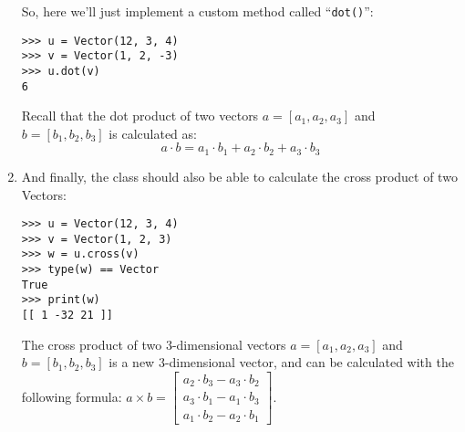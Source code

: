 \begin{enumerate}
So, here we'll just implement a custom method called ``\texttt{dot()}'':
\begin{verbatim}
>>> u = Vector(12, 3, 4)
>>> v = Vector(1, 2, -3)
>>> u.dot(v)
6
\end{verbatim}

Recall that the dot product of two vectors
$a = [a_1, a_2, a_3]$ and $b = [b_1, b_2, b_3]$
is calculated as:
\[a \cdot b = a_1 \cdot b_1 + a_2 \cdot b_2 + a_3 \cdot b_3\]

\item
And finally, the class should also be able to calculate
the cross product of two Vectors:
\begin{verbatim}
>>> u = Vector(12, 3, 4)
>>> v = Vector(1, 2, 3)
>>> w = u.cross(v)
>>> type(w) == Vector
True
>>> print(w)
[[ 1 -32 21 ]]
\end{verbatim}

The cross product of two $3$-dimensional vectors
$a = [a_1, a_2, a_3]$ and $b = [b_1, b_2, b_3]$
is a new $3$-dimensional vector,
and can be calculated with the following formula:
$a \times b = \begin{bmatrix}
    a_2 \cdot b_3 - a_3 \cdot b_2 \\
    a_3 \cdot b_1 - a_1 \cdot b_3 \\
    a_1 \cdot b_2 - a_2 \cdot b_1
\end{bmatrix}$.

\end{enumerate}
